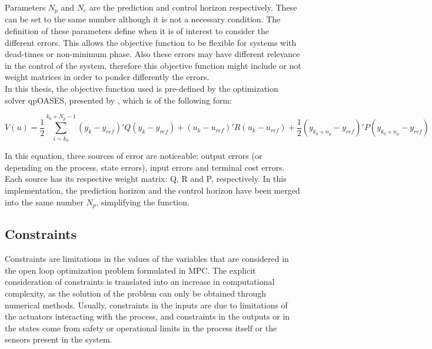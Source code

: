 Parameters $N_{p}$ and $N_{c}$ are the prediction and control horizon respectively. These can be set to the same number although it is not a necessary condition. The definition of these parameters define when it is of interest to consider the different errors. This allows the objective function to be flexible for systems with dead-times or non-minimum phase. Also these errors may have different relevance in the control of the system, therefore this objective function might include or not weight matrices in order to ponder differently the errors.\\

In this thesis, the objective function used is pre-defined by the optimization solver qpOASES, presented by \cite{Ferreau2011}, which is of the following form:

\begin{equation} \label{objectivefunction2}
V(u) = \frac{1}{2} \sum_{i=k_{0}}^{k_{0} + N_{p} - 1} (y_{k} - y_{ref})'Q(y_{k} - y_{ref}) + (u_{k} - u_{ref})'R(u_{k} - u_{ref}) + \frac{1}{2} (y_{k_{0} + n_{p}} - y_{ref})'P(y_{k_{0} + n_{p}} - y_{ref})
\end{equation}

In this equation, three sources of error are noticeable: output errors (or depending on the process, state errors), input errors and terminal cost errors. Each source has its respective weight matrix: Q, R and P, respectively. In this implementation, the prediction horizon and the control horizon have been merged into the same number $N_{p}$, simplifying the function.

\subsection{Constraints}%

Constraints are limitations in the values of the variables that are considered in the open loop optimization problem formulated in MPC. The explicit consideration of constraints is translated into an increase in computational complexity, as the solution of the problem can only be obtained through numerical methods. Usually, constraints in the inputs are due to limitations of the actuators interacting with the process, and constraints in the outputs or in the states come from safety or operational limits in the process itself or the sensors present in the system.\\


